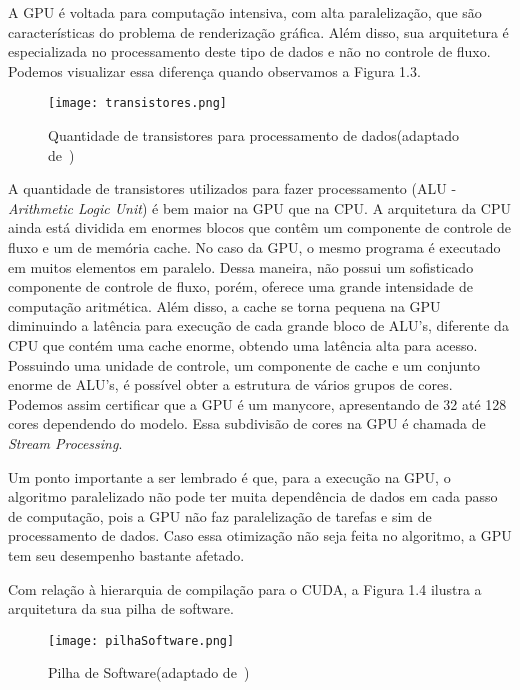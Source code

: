 A GPU é voltada para computação intensiva, com alta paralelização, que são características do problema de renderização gráfica. Além disso, sua arquitetura é especializada no processamento deste tipo de dados e não no controle de fluxo. Podemos visualizar essa diferença quando
observamos a Figura 1.3.

\begin{figure}[!htb]
	\begin{center}
	\centering
			\texttt{[image: transistores.png]}
	\label{fig: transistores}
	\caption{Quantidade de transistores para processamento de dados(adaptado de~\citep{cuda})}
	\end{center}
\end{figure}

A quantidade de transistores utilizados para fazer processamento (ALU - \textit{Arithmetic Logic Unit}) é bem maior na GPU que na CPU. A arquitetura da CPU ainda está dividida em enormes blocos que contêm um componente de controle de fluxo e um de memória cache. No caso da GPU, o mesmo programa é executado em muitos elementos em paralelo. Dessa maneira, não possui um sofisticado componente de controle de fluxo, porém, oferece uma grande intensidade de computação aritmética. Além disso, a cache se torna pequena na GPU diminuindo a latência para execução de cada grande bloco de ALU's, diferente da CPU que contém uma cache enorme, obtendo uma latência alta para acesso. Possuindo uma unidade de controle, um componente de cache e um conjunto enorme de ALU's, é possível obter a estrutura de vários grupos de
cores. Podemos assim certificar que a GPU é um manycore, apresentando de 32 até 128 cores dependendo do modelo. Essa subdivisão de cores na GPU é chamada de \textit{Stream Processing}.

Um ponto importante a ser lembrado é que, para a execução na GPU, o algoritmo paralelizado não pode ter muita dependência de dados em cada passo de computação, pois a GPU não faz paralelização de tarefas e sim de processamento de dados. Caso essa otimização não seja feita no algoritmo, a GPU tem seu desempenho bastante afetado.

Com relação à hierarquia de compilação para o CUDA, a Figura 1.4 ilustra a arquitetura da sua pilha de software.

\begin{figure}[!htb]
	\begin{center}
	\centering
			\texttt{[image: pilhaSoftware.png]}
	\label{fig: pilhaSoftware}
	\caption{Pilha de Software(adaptado de~\citep{cuda})}
	\end{center}
\end{figure}

